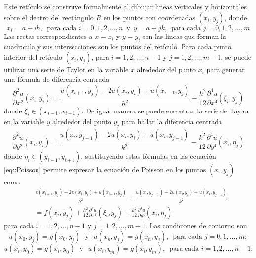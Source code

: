 \documentclass[a4paper]{article}
\begin{document}
Este retículo se construye formalmente al dibujar lineas verticales y horizontales sobre el dentro del rectángulo $R$ en los puntos con coordenadas $(x_i, y_j)$, donde
\begin{equation}
x_i=a+ih,\,\,\,\text{para cada }i=0,1,2,\hdots,n\, \text{ y }\, y=a+jk,\,\,\,\text{para cada }j=0,1,2,\hdots,m
\end{equation}
Las rectas correspondientes a $x=x_i$ y $y=y_i$ son las lineas que forman la cuadricula y sus intersecciones son los puntos del retículo. Para cada punto interior del retículo $(x_i,y_j)$, para $i=1,2,\hdots,n-1$ y $j=1,2,\hdots,m-1$, se puede utilizar una serie de Taylor en la variable $x$ alrededor del punto $x_i$ para generar una fórmula de diferencia centrada
\begin{equation}
\frac{\partial^2 u}{\partial x^2}(x_i,y_i)=\frac{u(x_{i+1},y_j)-2u(x_i,y_i)+u(x_{i-1},y_j)}{h^2}-\frac{h^2}{12}\frac{\partial^4 u}{\partial x^4}(\xi_i,y_j)
\end{equation}
donde $\xi_i \in (x_{i-1},x_{i+1})$. De igual manera se puede encontrar la serie de Taylor en la variable $y$ alrededor del punto $y_j$ para hallar la diferencia centrada
\begin{equation}
\frac{\partial^2 u}{\partial y^2}(x_i,y_i)=\frac{u(x_{i},y_{j+1})-2u(x_i,y_i)+u(x_{i},y_{j-1})}{k^2}-\frac{k^2}{12}\frac{\partial^4 u}{\partial y^4}(x_i,\eta_j)
\end{equation}
donde $\eta_i \in (y_{i-1},y_{i+1})$, sustituyendo estas fórmulas en las ecuación \ref{eq::Poisson} permite expresar la ecuación de Poisson en los puntos $(x_i,y_j)$ como
\begin{equation}
\begin{aligned}
&\frac{u(x_{i+1},y_j)-2u(x_i,y_i)+u(x_{i-1},y_j)}{h^2}+\frac{u(x_{i},y_{j+1})-2u(x_i,y_i)+u(x_{i},y_{j-1})}{k^2}\\
&=f(x_i,y_j)+\frac{h^2}{12}\frac{\partial^4 u}{\partial x^4}(\xi_i,y_j)+\frac{k^2}{12}\frac{\partial^4 u}{\partial y^4}(x_i,\eta_j)
\end{aligned}
\end{equation}
para cada $i=1,2,\hdots,n-1$ y $j=1,2,\hdots,m-1$. Las condiciones de contorno son
\begin{equation*}
u(x_0,y_j)=g(x_0,y_j)\,\, \text{ y } \,\, u(x_n,y_j)=g(x_n,y_j),\,\,\, \text{para cada }j=0,1,\hdots,m;
\end{equation*}
\begin{equation*}
u(x_i,y_0)=g(x_i,y_0)\,\, \text{ y } \,\, u(x_i,y_m)=g(x_i,y_m),\,\,\, \text{para cada }i=1,2,\hdots,n-1;
\end{equation*}
\end{document}
